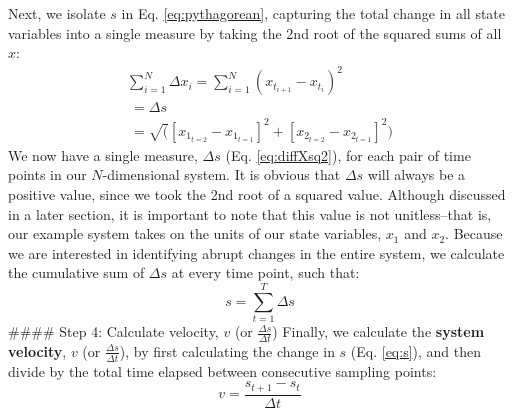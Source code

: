 \documentclass[12pt,twoside,openany]{reedthesis}
\begin{document}
Next, we isolate \(s\) in Eq. \eqref{eq:pythagorean}, capturing the total change in all state variables into a single measure by taking the 2nd root of the squared sums of all \(x\):
\begin{equation}
\begin{array}{rcr}
\sum_{i=1}^{N} \Delta {x_i} = \sum_{i=1}^{N}(x_{t_{i+1}} - x_{t_i})^2 \\ 
\ = \Delta s \\ 
\ = \sqrt([x_{1_{t=2}} - x_{1_{t=1}}]^2 + [x_{2_{t=2}} - x_{2_{t=1}}]^2)
\end{array}
\label{eq:diffXsq2}
\end{equation}
We now have a single measure, \(\Delta s\) (Eq. \eqref{eq:diffXsq2}), for each pair of time points in our \(N\)-dimensional system. It is obvious that \(\Delta s\) will always be a positive value, since we took the 2nd root of a squared value. Although discussed in a later section, it is important to note that this value is not unitless--that is, our example system takes on the units of our state variables, \(x_1\) and \(x_2\). Because we are interested in identifying abrupt changes in the entire system, we calculate the cumulative sum of \(\Delta s\) at every time point, such that:
\begin{equation}
s = \sum_{t=1}^T \Delta s
\label{eq:s}
\end{equation}
\#\#\#\# Step 4: Calculate velocity, \(v\) (or \(\frac {\Delta s}{\Delta t}\))
Finally, we calculate the \textbf{system velocity}, \(v\) (or \(\frac{\Delta s}{\Delta t}\)), by first calculating the change in \(s\) (Eq. \eqref{eq:s}), and then divide by the total time elapsed between consecutive sampling points:
\begin{equation}
 v = \frac {s_{t+1}-s_{t}}{\Delta t} 
\label{eq:velocity}
\end{equation}
\end{document}
